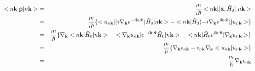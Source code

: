 \documentclass[aps,prb,preprint]{revtex4-1}
\begin{document}
\begin{appendix}
\begin{eqnarray}
<n{\bf k}|\hat{\bf p}|n{\bf k}> &=& \frac{m}{i \hbar} <n{\bf k}|[\hat{\bf x},\hat{H}_0]|n{\bf k}> \nonumber \\
&=& \frac{m}{i \hbar} \{ <u_{n{\bf k}}| (i \nabla_{\bf k} e^{-i{\bf k \cdot \hat{x} }} ) \hat{H}_0 |n{\bf k}> - <n{\bf k}| \hat{H}_0 (-i\nabla_{\bf k} e^{i{\bf k \cdot \hat{x}} }) |u_{n{\bf k}}> \} \nonumber \\
&=& \frac{m}{\hbar} \{  \nabla_{\bf k} <n{\bf k}|\hat{H}_0|n{\bf k}> - <\nabla_{\bf k} u_{n{\bf k}}| e^{-i{\bf k \cdot \hat{x}} } \hat{H}_0  |n{\bf k}> - <n{\bf k}| \hat{H}_0 e^{i{\bf k \cdot \hat{x}} }|\nabla_{\bf k} u_{n{\bf k}}> \} \nonumber \\
&=& \frac{m}{\hbar} \{  \nabla_{\bf k} \epsilon_{n{\bf k}} -  \epsilon_{n{\bf k}} \nabla_{\bf k} <u_{n{\bf k}}| u_{n{\bf k}}>\}  \nonumber \\
&=& \frac{m}{\hbar} \nabla_{\bf k} \epsilon_{n{\bf k}}
\end{eqnarray} 



\end{appendix}
\end{document}
